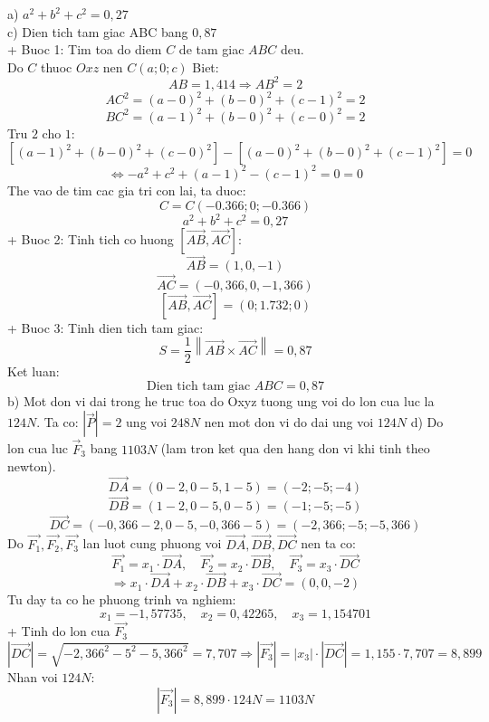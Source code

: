 \documentclass[a4paper,12pt]{article}
\begin{document}
a) \(a^2+b^2+c^2=0{,}27\) \\ c) Dien tich tam giac ABC bang \(0{,}87\)\\ + Buoc 1: Tim toa do diem \(C\) de tam giac \(ABC\) deu. \\ Do \(C\) thuoc \(Oxz\) nen \(C(a; 0; c)\) Biet: \[ AB = 1{,}414 \Rightarrow AB^2 = 2 \] \[ AC^2 = (a - 0)^2 + (b - 0)^2 + (c - 1)^2 = 2 \tag{1} \] \[ BC^2 = (a - 1)^2 + (b - 0)^2 + (c - 0)^2 = 2 \tag{2} \] Tru \(2\) cho \(1\): \[ \left[(a - 1)^2 + (b - 0)^2 + (c - 0)^2\right] - \left[(a - 0)^2 + (b - 0)^2 + (c - 1)^2\right] = 0 \] \[ \Leftrightarrow - a^{2} + c^{2} + \left(a - 1\right)^{2} - \left(c - 1\right)^{2} = 0 = 0 \] The vao de tim cac gia tri con lai, ta duoc: \[ C = C(-0.366; 0; -0.366) \] \[ a^2 + b^2 + c^2 = 0{,}27 \] + Buoc 2: Tinh tich co huong \([\overrightarrow{AB} , \overrightarrow{AC}]\): \[ \overrightarrow{AB} = (1, 0, -1) \] \[ \overrightarrow{AC} = (-0{,}366, 0, -1{,}366) \] \[ [\overrightarrow{AB}, \overrightarrow{AC}] = (0; 1.732; 0) \] + Buoc 3: Tinh dien tich tam giac: \[ S = \dfrac{1}{2} \left\| \overrightarrow{AB} \times \overrightarrow{AC} \right\| = 0{,}87 \] Ket luan: \[ \boxed{\text{Dien tich tam giac } ABC = 0{,}87} \] b) Mot don vi dai trong he truc toa do Oxyz tuong ung voi do lon cua luc la \(124 N\). Ta co: \(|\overrightarrow{P}|=2\) ung voi \(248 N\) nen mot don vi do dai ung voi \(124 N\) d) Do lon cua luc \(\overrightarrow{F}_3\) bang \(1103 N\) (lam tron ket qua den hang don vi khi tinh theo newton). \[ \overrightarrow{DA} = (0-2, 0-5, 1-5) = (-2; -5; -4) \] \[ \overrightarrow{DB} = (1-2, 0-5, 0-5) = (-1; -5; -5) \] \[ \overrightarrow{DC} = (-0{,}366-2, 0-5, -0{,}366-5) = (-2{,}366; -5; -5{,}366) \] Do \(\overrightarrow{F_1},\overrightarrow{F_2}, \overrightarrow{F_3}\) lan luot cung phuong voi \(\overrightarrow{DA}, \overrightarrow{DB}, \overrightarrow{DC}\) nen ta co: \[ \overrightarrow{F_1} = x_1 \cdot \overrightarrow{DA},\quad \overrightarrow{F_2} = x_2 \cdot \overrightarrow{DB},\quad \overrightarrow{F_3} = x_3 \cdot \overrightarrow{DC} \] \[ \Rightarrow x_1 \cdot \overrightarrow{DA} + x_2 \cdot \overrightarrow{DB} + x_3 \cdot \overrightarrow{DC} = (0, 0, -2) \] Tu day ta co he phuong trinh va nghiem: \[ x_1 = -1{,}57735,\quad x_2 = 0{,}42265,\quad x_3 = 1{,}154701 \] + Tinh do lon cua \(\overrightarrow{F_3}\) \[ |\overrightarrow{DC}| = \sqrt{-2{,}366^2 - 5^2 - 5{,}366^2} = 7{,}707 \Rightarrow |\overrightarrow{F_3}| = |x_3| \cdot |\overrightarrow{DC}| = 1{,}155 \cdot 7{,}707 = 8{,}899 \] Nhan voi \(124 N\): \[ |\overrightarrow{F_3}| = 8{,}899 \cdot 124 N = 1103 N \]
\end{document}

